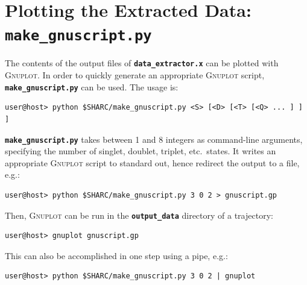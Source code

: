 \documentclass[a4paper,11pt,DIV=15,openany,twoside=false]{scrbook}
\newcommand{\ttt}[1]{\textbf{\texttt{#1}}}
\begin{document}
\section{Plotting the Extracted Data: \ttt{make\_gnuscript.py}}\label{sec:make_gnuscript.py}

The contents of the output files of \ttt{data\_extractor.x} can be plotted with \textsc{Gnuplot}. In order to quickly generate an appropriate \textsc{Gnuplot} script, \ttt{make\_gnuscript.py} can be used. The usage is:
\begin{verbatim}
user@host> python $SHARC/make_gnuscript.py <S> [<D> [<T> [<Q> ... ] ] ]
\end{verbatim}
\ttt{make\_gnuscript.py} takes between 1 and 8 integers as command-line arguments, specifying the number of singlet, doublet, triplet, etc.\ states. It writes an appropriate \textsc{Gnuplot} script to standard out, hence redirect the output to a file, e.g.:
\begin{verbatim}
user@host> python $SHARC/make_gnuscript.py 3 0 2 > gnuscript.gp
\end{verbatim}


Then, \textsc{Gnuplot} can be run in the \ttt{output\_data} directory of a trajectory:
\begin{verbatim}
user@host> gnuplot gnuscript.gp
\end{verbatim}
This can also be accomplished in one step using a pipe, e.g.:
\begin{verbatim}
user@host> python $SHARC/make_gnuscript.py 3 0 2 | gnuplot
\end{verbatim}
\end{document}
